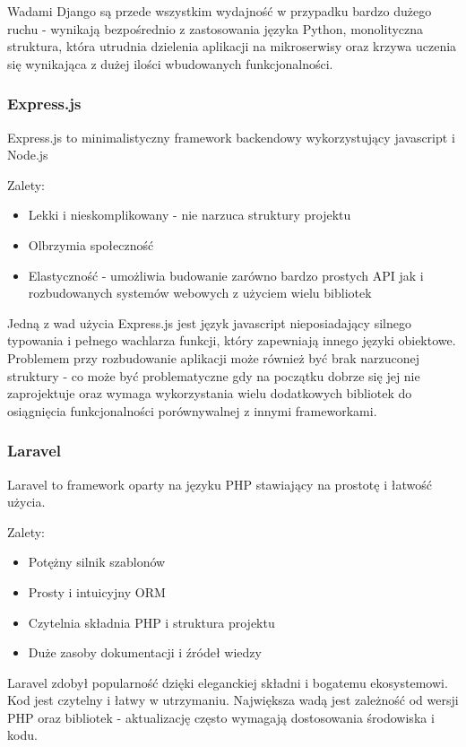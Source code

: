 Wadami Django są przede wszystkim wydajność w przypadku bardzo dużego ruchu - wynikają bezpośrednio z zastosowania języka Python, monolityczna struktura, która utrudnia dzielenia aplikacji na mikroserwisy oraz krzywa uczenia się wynikająca z dużej ilości wbudowanych funkcjonalności.

\subsubsection{Express.js}

Express.js to minimalistyczny framework backendowy wykorzystujący javascript i Node.js


Zalety:
\begin{itemize}
	\item Lekki i nieskomplikowany - nie narzuca struktury projektu
	\item Olbrzymia społeczność
	\item Elastyczność - umożliwia budowanie zarówno bardzo prostych API jak i rozbudowanych systemów webowych z użyciem wielu bibliotek
\end{itemize}


Jedną z wad użycia Express.js jest język javascript nieposiadający silnego typowania i pełnego wachlarza funkcji, który zapewniają innego języki obiektowe. Problemem przy rozbudowanie aplikacji może również być brak narzuconej struktury - co może być problematyczne gdy na początku dobrze się jej nie zaprojektuje oraz wymaga wykorzystania wielu dodatkowych bibliotek do osiągnięcia funkcjonalności porównywalnej z innymi frameworkami.

\subsubsection{Laravel}

Laravel to framework oparty na języku PHP stawiający na prostotę i łatwość użycia.


Zalety:
\begin{itemize}
	\item Potężny silnik szablonów
	\item Prosty i intuicyjny ORM
	\item Czytelnia składnia PHP i struktura projektu
	\item Duże zasoby dokumentacji i źródeł wiedzy
\end{itemize}


Laravel zdobył popularność dzięki eleganckiej składni i bogatemu ekosystemowi. Kod jest czytelny i łatwy w utrzymaniu. Największa wadą jest zależność od wersji PHP oraz bibliotek - aktualizację często wymagają dostosowania środowiska i kodu.

